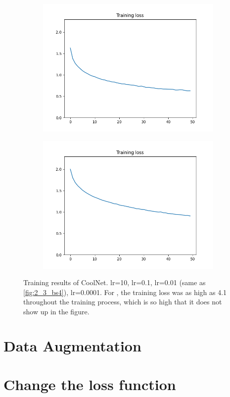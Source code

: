 \documentclass[12pt]{article}
\begin{document}
\begin{figure}
\begin{subfigure}{0.19\textwidth}
    \includegraphics[width=\linewidth]{loss_2_3_bs4.png}
    \caption{}
    \label{fig:3_lr1e-2}
  \end{subfigure}
  \begin{subfigure}{0.19\textwidth}
    \centering
    \includegraphics[width=\linewidth]{loss_3_lr1e-4.png}
    \caption{}
    \label{fig:3_lr1e-4}
  \end{subfigure}
  \caption{Training results of CoolNet.  lr=10,  lr=0.1,  lr=0.01 (same as \ref{fig:2_3_bs4}),  lr=0.0001. For , the training loss was as high as 4.1 throughout the training process, which is so high that it does not show up in the figure.}
  \label{fig:3}
\end{figure}

\section{Data Augmentation}

\section{Change the loss function}



\end{document}
